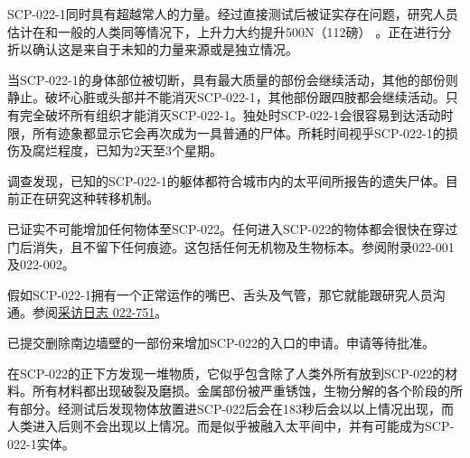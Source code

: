 SCP-022-1同时具有超越常人的力量。经过直接测试后被证实存在问题，研究人员估计在和一般的人类同等情况下，上升力大约提升500N（112磅） 。正在进行分折以确认这是来自于未知的力量来源或是独立情况。

当SCP-022-1的身体部位被切断，具有最大质量的部份会继续活动，其他的部份则静止。破坏心脏或头部并不能消灭SCP-022-1，其他部份跟四肢都会继续活动。只有完全破坏所有组织才能消灭SCP-022-1。独处时SCP-022-1会很容易到达活动时限，所有迹象都显示它会再次成为一具普通的尸体。所耗时间视乎SCP-022-1的损伤及腐烂程度，已知为2天至3个星期。

调查发现，已知的SCP-022-1的躯体都符合城市内的太平间所报告的遗失尸体。目前正在研究这种转移机制。

已证实不可能增加任何物体至SCP-022。任何进入SCP-022的物体都会很快在穿过门后消失，且不留下任何痕迹。这包括任何无机物及生物标本。参阅附录022-001及022-002。

假如SCP-022-1拥有一个正常运作的嘴巴、舌头及气管，那它就能跟研究人员沟通。参阅\hyperref[sec:DOC-interview-log-022-751]{采访日志 022-751}。

 已提交删除南边墙壁的一部份来增加SCP-022的入口的申请。申请等待批准。

 在SCP-022的正下方发现一堆物质，它似乎包含除了人类外所有放到SCP-022的材料。所有材料都出现破裂及磨损。金属部份被严重锈蚀，生物分解的各个阶段的所有部分。经测试后发现物体放置进SCP-022后会在183秒后会以以上情况出现，而人类进入后则不会出现以上情况。而是似乎被融入太平间中，并有可能成为SCP-022-1实体。

\newpage


